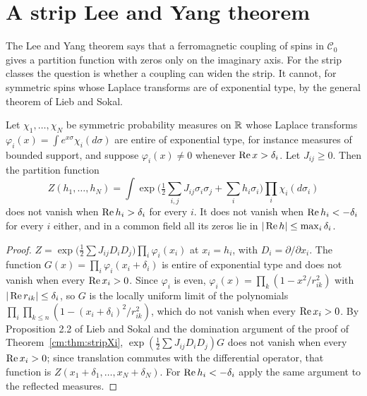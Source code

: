 \section{A strip Lee and Yang theorem}\label{cm:sec:strip}

The Lee and Yang theorem says that a ferromagnetic coupling of spins in $\mathcal C_0$ gives a partition function with zeros only on the imaginary axis. For the strip classes the question is whether a coupling can widen the strip. It cannot, for symmetric spins whose Laplace transforms are of exponential type, by the general theorem of Lieb and Sokal.

\begin{theorem}\label{cm:thm:stripLY}
Let $\chi_1,\dots,\chi_N$ be symmetric probability measures on $\mathbb{R}$ whose Laplace transforms $\varphi_i(x)=\int e^{x\sigma}\chi_i(d\sigma)$ are entire of exponential type, for instance measures of bounded support, and suppose $\varphi_i(x)\ne0$ whenever $\operatorname{Re} x>\delta_i$. Let $J_{ij}\ge0$. Then the partition function
\[
Z(h_1,\dots,h_N)=\int\exp\Big(\tfrac12\sum_{i,j}J_{ij}\sigma_i\sigma_j+\sum_ih_i\sigma_i\Big)\prod_i\chi_i(d\sigma_i)
\]
does not vanish when $\operatorname{Re} h_i>\delta_i$ for every $i$. It does not vanish when $\operatorname{Re} h_i<-\delta_i$ for every $i$ either, and in a common field all its zeros lie in $|\operatorname{Re} h|\le\max_i\delta_i$.
\end{theorem}

\begin{proof}
$Z=\exp\big(\frac12\sum J_{ij}D_iD_j\big)\prod_i\varphi_i(x_i)$ at $x_i=h_i$, with $D_i=\partial/\partial x_i$. The function $G(x)=\prod_i\varphi_i(x_i+\delta_i)$ is entire of exponential type and does not vanish when every $\operatorname{Re} x_i>0$. Since $\varphi_i$ is even, $\varphi_i(x)=\prod_k(1-x^2/r_{ik}^2)$ with $|\operatorname{Re} r_{ik}|\le\delta_i$, so $G$ is the locally uniform limit of the polynomials $\prod_i\prod_{k\le n}(1-(x_i+\delta_i)^2/r_{ik}^2)$, which do not vanish when every $\operatorname{Re} x_i>0$. By Proposition 2.2 of Lieb and Sokal \cite{LiebSokal81} and the domination argument of the proof of Theorem~\ref{cm:thm:stripXi}, $\exp(\frac12\sum J_{ij}D_iD_j)G$ does not vanish when every $\operatorname{Re} x_i>0$; since translation commutes with the differential operator, that function is $Z(x_1+\delta_1,\dots,x_N+\delta_N)$. For $\operatorname{Re} h_i<-\delta_i$ apply the same argument to the reflected measures.
\end{proof}

